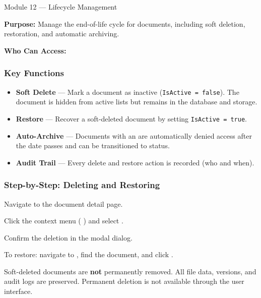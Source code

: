 \vspace{10pt}

\begin{ugModule}{Module 12 --- Lifecycle Management}

  \textbf{Purpose:}
  Manage the end-of-life cycle for documents, including soft
  deletion, restoration, and automatic archiving.

  \textbf{Who Can Access:}
   

  \subsubsection*{Key Functions}
  \begin{itemize}[leftmargin=18pt]
    \item \textbf{Soft Delete} --- Mark a document as inactive
      (\texttt{IsActive = false}). The document is hidden from
      active lists but remains in the database and storage.
    \item \textbf{Restore} --- Recover a soft-deleted document
      by setting \texttt{IsActive = true}.
    \item \textbf{Auto-Archive} --- Documents with an
       are automatically denied access
      after the date passes and can be transitioned to
       status.
    \item \textbf{Audit Trail} --- Every delete and restore
      action is recorded (who and when).
  \end{itemize}

  \subsubsection*{Step-by-Step: Deleting and Restoring}
  \begin{ugSteps}
    \item Navigate to the document detail page.
    \item Click the context menu (\,\faEllipsisV\,) and select
          .
    \item Confirm the deletion in the modal dialog.
    \item To restore: navigate to ,
          find the document, and click .
  \end{ugSteps}

  \begin{ugWarning}
    Soft-deleted documents are \textbf{not} permanently removed.
    All file data, versions, and audit logs are preserved.
    Permanent deletion is not available through the user
    interface.
  \end{ugWarning}
\end{ugModule}

\newpage
